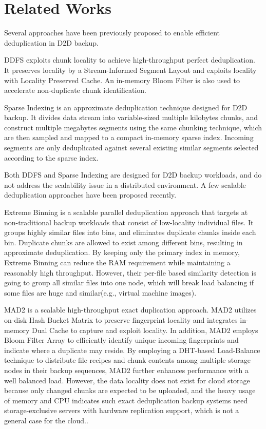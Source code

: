 \section{Related Works}
Several approaches have been previously proposed to enable efficient deduplication in D2D backup.

DDFS\cite{bottleneck08} exploits chunk locality to achieve high-throughput perfect deduplication. 
It preserves locality by a Stream-Informed Segment Layout and exploits locality with Locality Preserved Cache. 
An in-memory Bloom Filter is also used to accelerate non-duplicate chunk identification.

Sparse Indexing\cite{sparseindex09} is an approximate deduplication technique designed for D2D backup. 
It divides data stream into variable-sized multiple kilobytes chunks, and construct multiple megabytes segments
using the same chunking technique, 
which are then sampled and mapped to a compact in-memory sparse index. 
Incoming segments are only deduplicated against several existing similar 
segments selected according to the sparse index.

Both DDFS and Sparse Indexing are designed for D2D backup workloads, 
and do not address the scalability issue in a distributed environment. 
A few scalable deduplication approaches have been proposed recently.

Extreme Binning\cite{extreme_binning09} is a scalable parallel deduplication approach 
that targets at non-traditional backup workloads that consist of low-locality individual files. 
It groups highly similar files into bins, and eliminates duplicate chunks inside each bin. 
Duplicate chunks are allowed to exist among different bins, resulting in approximate deduplication. 
By keeping only the primary index in memory, Extreme Binning can reduce the RAM requirement while 
maintaining a reasonably high throughput. However, their per-file based similarity detection 
is going to group all similar files into one node, which will break load balancing if some files are
huge and similar(e.g., virtual machine images).

MAD2\cite{mad210} is a scalable high-throughput exact duplication approach. 
MAD2 utilizes on-disk Hash Bucket Matrix to preserve fingerprint locality and 
integrates in-memory Dual Cache to capture and exploit locality. 
In addition, MAD2 employs Bloom Filter Array to efficiently identify unique 
incoming fingerprints and indicate where a duplicate may reside. 
By employing a DHT-based Load-Balance technique to distribute file recipes 
and chunk contents among multiple storage nodes in their backup sequences, 
MAD2 further enhances performance with a well balanced load. However, the
data locality does not exist for cloud storage because only changed chunks are expected
to be uploaded, and
the heavy usage of memory and CPU indicates such exact deduplication backup systems
need storage-exclusive servers with hardware replication support, which is not a general case 
for the cloud..

